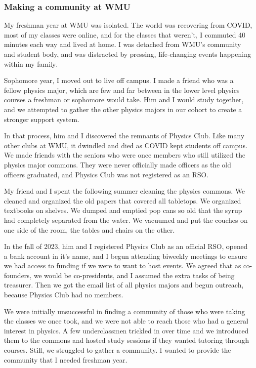 \documentclass[11pt]{article}
\begin{document}
\subsubsection*{Making a community at WMU}
My freshman year at WMU was isolated. The world was recovering from COVID, most of my classes were online, and for the classes that weren't, I commuted 40 minutes each way and lived at home. I was detached from WMU's community and student body, and was distracted by pressing, life-changing events happening within my family.

Sophomore year, I moved out to live off campus. I made a friend who was a fellow physics major, which are few and far between in the lower level physics courses a freshman or sophomore would take. Him and I would study together, and we attempted to gather the other physics majors in our cohort to create a stronger support system.

In that process, him and I discovered the remnants of Physics Club. Like many other clubs at WMU, it dwindled and died as COVID kept students off campus. We made friends with the seniors who were once members who still utilized the physics major commons. They were never officially made officers as the old officers graduated, and Physics Club was not registered as an RSO.

My friend and I spent the following summer cleaning the physics commons. We cleaned and organized the old papers that covered all tabletops. We organized textbooks on shelves. We dumped and emptied pop cans so old that the syrup had completely separated from the water. We vacuumed and put the couches on one side of the room, the tables and chairs on the other.

In the fall of 2023, him and I registered Physics Club as an official RSO, opened a bank account in it's name, and I begun attending biweekly meetings to ensure we had access to funding if we were to want to host events. We agreed that as co-founders, we would be co-presidents, and I assumed the extra tasks of being treasurer. Then we got the email list of all physics majors and begun outreach, because Physics Club had no members.

We were initially unsuccessful in finding a community of those who were taking the classes we once took, and we were not able to reach those who had a general interest in physics. A few underclassmen trickled in over time and we introduced them to the commons and hosted study sessions if they wanted tutoring through courses. Still, we struggled to gather a community. I wanted to provide the community that I needed freshman year.
\end{document}
